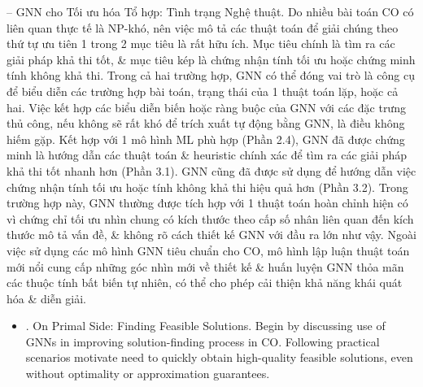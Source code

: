 \documentclass{article}
\begin{document}
\begin{itemize}
    -- {\sf GNN cho Tối ưu hóa Tổ hợp: Tình trạng Nghệ thuật.} Do nhiều bài toán CO có liên quan thực tế là NP-khó, nên việc mô tả các thuật toán để giải chúng theo thứ tự ưu tiên 1 trong 2 mục tiêu là rất hữu ích. Mục tiêu chính là tìm ra các giải pháp khả thi tốt, \& mục tiêu kép là chứng nhận tính tối ưu hoặc chứng minh tính không khả thi. Trong cả hai trường hợp, GNN có thể đóng vai trò là công cụ để biểu diễn các trường hợp bài toán, trạng thái của 1 thuật toán lặp, hoặc cả hai. Việc kết hợp các biểu diễn biến hoặc ràng buộc của GNN với các đặc trưng thủ công, nếu không sẽ rất khó để trích xuất tự động bằng GNN, là điều không hiếm gặp. Kết hợp với 1 mô hình ML phù hợp (Phần 2.4), GNN đã được chứng minh là hướng dẫn các thuật toán \& heuristic chính xác để tìm ra các giải pháp khả thi tốt nhanh hơn (Phần 3.1). GNN cũng đã được sử dụng để hướng dẫn việc chứng nhận tính tối ưu hoặc tính không khả thi hiệu quả hơn (Phần 3.2). Trong trường hợp này, GNN thường được tích hợp với 1 thuật toán hoàn chỉnh hiện có vì chứng chỉ tối ưu nhìn chung có kích thước theo cấp số nhân liên quan đến kích thước mô tả vấn đề, \& không rõ cách thiết kế GNN với đầu ra lớn như vậy. Ngoài việc sử dụng các mô hình GNN tiêu chuẩn cho CO, mô hình lập luận thuật toán mới nổi cung cấp những góc nhìn mới về thiết kế \& huấn luyện GNN thỏa mãn các thuộc tính bất biến tự nhiên, có thể cho phép cải thiện khả năng khái quát hóa \& diễn giải.
    \begin{itemize}
        \item {. On Primal Side: Finding Feasible Solutions.} Begin by discussing use of GNNs in improving solution-finding process in CO. Following practical scenarios motivate need to quickly obtain high-quality feasible solutions, even without optimality or approximation guarantees.


\end{itemize}
\end{itemize}
\end{document}
